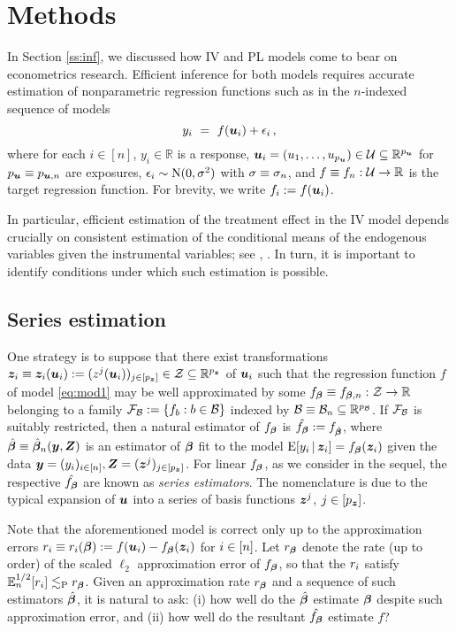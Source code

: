\documentclass{uwstat572}
\newcommand{\be}{\begin{equation}}
\newcommand{\ee}{\end{equation}}
\theoremstyle{definition}
\theoremstyle{remark}
\newcommand{\R}{\ensuremath{\mathbb{R}}}
\newcommand{\Prb}{\mathrm{P}}
\newcommand{\E}{\mathrm{E}}
\newcommand{\Ex}{\mathbb{E}}
\newcommand{\Exn}{\Ex_n}
\newcommand{\Normal}{\mathrm{N}}
\numberwithin{equation}{section}
\begin{document}
\section{Methods}\label{s:methods}

In Section \ref{ss:inf}, we discussed how IV and PL models come to bear on econometrics research. Efficient inference for both models requires accurate estimation of nonparametric regression functions such as in the $n$-indexed sequence of models
\be\label{eq:mod1}
	y_i \ = \ f(\u_i) + \ersi\,,
\ee
where for each $i\in[n]$, $y_i \in \R$ is a response, $\u_i = (u_1,\ldots,u_{\pu}) \in \Us \subseteq \R^{\pu}$ for $p_{\boldsymbol{u}} \equiv p_{\boldsymbol{u},n}$ are exposures, $\ersi \sim \Normal(0,\sd^2)$ with $\sigma \equiv \sigma_n$, and $f \equiv f_n : \Us \to \R$ is the target regression function. For brevity, we write $f_i := f(\boldsymbol{u}_i)$. 

In particular, efficient estimation of the treatment effect in the IV model depends crucially on consistent estimation of the conditional means of the endogenous variables given the instrumental variables; see \cite{A74}, \cite{N90}. In turn, it is important to identify conditions under which such estimation is possible. 




%
% 
\subsection{Series estimation}\label{ss:se}

One strategy is to suppose that there exist transformations $\z_i \equiv \z_i(\u_i) := (z^j(\u_i))_{j\in[\pz]} \in \Zs \subseteq \R^{\pz}$ of $\boldsymbol{u}_i$ such that the regression function $f$ of model \eqref{eq:mod1} may be well approximated by some $\fb \equiv \fbn : \Zs \to \R$ belonging to a family $\mathcal{F}_{\mathcal{B}} := \{ f_b:b\in\mathcal{B}\}$ indexed by $\Bs \equiv \Bs_n \subseteq \R^{p_\Bs}$. If $\mathcal{F}_{\mathcal{B}}$ is suitably restricted, then a natural estimator of $f_{\boldsymbol{\beta}}$ is $\hat{f_{\boldsymbol{\beta}}} := f_{\hat{\boldsymbol{\beta}}}$, where $\hat{\boldsymbol{\beta}} \equiv \hat{\boldsymbol{\beta}}_n(\boldsymbol{y}, \boldsymbol{Z})$ is an estimator of $\boldsymbol{\beta}$ fit to the model $\E[y_i\,|\,\z_i] = \fb(\z_i)$ given the data $\boldsymbol{y} = (y_i)_{i\in[n]}, \boldsymbol{Z} = (\boldsymbol{z}^j)_{j\in[{p_{\boldsymbol{z}}}]}$. For linear $f_{\boldsymbol{\beta}}$, as we consider in the sequel, the respective $\hat{f_{\boldsymbol{\beta}}}$ are known as \emph{series estimators}. The nomenclature is due to the typical expansion of $\boldsymbol{u}$ into a series of basis functions $\boldsymbol{z}^j$, $j\in[{p_{\boldsymbol{z}}}]$. 

Note that the aforementioned model is correct only up to the approximation errors $r_i \equiv r_i(\boldsymbol{\beta}) := f(\boldsymbol{u}_i) - f_{\boldsymbol{\beta}}(\boldsymbol{z}_i)$ for $i\in[n]$. Let $r_{\boldsymbol{\beta}}$ denote the rate (up to order) of the scaled $\ell_2$ approximation error of $f_{\boldsymbol{\beta}}$, so that the $r_i$ satisfy $\Exn^{1/2}[r_i] \lesssim_\Prb \rb$. Given an approximation rate $r_{\boldsymbol{\beta}}$ and a sequence of such estimators $\hat{\boldsymbol{\beta}}$, it is natural to ask: (i) how well do the $\hat{\boldsymbol{\beta}}$ estimate $\boldsymbol{\beta}$ despite such approximation error, and (ii) how well do the resultant $\hat{f_{\boldsymbol{\beta}}}$ estimate $f$? 
\end{document}
